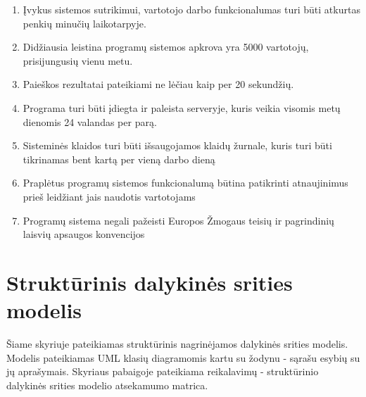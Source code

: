 \documentclass{VUMIFPSkursinis}
\begin{document}
\begin{enumerate}[label=\textbf{NFR\arabic*}.]
                    \item Įvykus sistemos sutrikimui, vartotojo darbo funkcionalumas turi būti atkurtas penkių minučių laikotarpyje.
                    \item Didžiausia leistina programų sistemos apkrova yra 5000 vartotojų, prisijungusių vienu metu.
                    \item Paieškos rezultatai pateikiami ne lėčiau kaip per 20 sekundžių.
                    \item Programa turi būti įdiegta ir paleista serveryje, kuris veikia visomis metų dienomis 24 valandas per parą.
                    \item Sisteminės klaidos turi būti išsaugojamos klaidų žurnale, kuris turi būti tikrinamas bent kartą per vieną darbo dieną
                    \item Praplėtus programų sistemos funkcionalumą būtina patikrinti atnaujinimus prieš leidžiant jais naudotis vartotojams
                    \item Programų sistema negali pažeisti Europos Žmogaus teisių ir pagrindinių laisvių apsaugos konvencijos
                \end{enumerate}
      
        \section{Struktūrinis dalykinės srities modelis}
            Šiame skyriuje pateikiamas struktūrinis nagrinėjamos dalykinės srities modelis. Modelis pateikiamas UML klasių diagramomis kartu su žodynu - sąrašu esybių su jų aprašymais. Skyriaus pabaigoje pateikiama reikalavimų - struktūrinio dalykinės srities modelio atsekamumo matrica.
\end{document}
